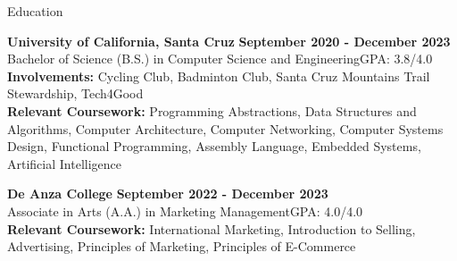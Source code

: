 \documentclass{resume}
\begin{document}
\begin{rSection}{\large Education}

{\bf University of California, Santa Cruz} \hfill {\bf{September 2020 - December 2023}}
\\ Bachelor of Science (B.S.) in Computer Science and Engineering\hfill {GPA: 3.8/4.0}
\\ \textbf{Involvements:}  Cycling Club, Badminton Club, Santa Cruz Mountains Trail Stewardship, Tech4Good
\\ \textbf{Relevant Coursework:} Programming Abstractions, Data Structures and Algorithms, Computer Architecture, Computer Networking, Computer Systems Design, Functional Programming, Assembly Language, Embedded Systems, Artificial Intelligence

{\bf De Anza College} \hfill {\bf{September 2022 - December 2023}}
\\ Associate in Arts (A.A.) in Marketing Management\hfill {GPA: 4.0/4.0}
\\ \textbf{Relevant Coursework:} International Marketing, Introduction to Selling, Advertising, Principles of Marketing, Principles of E-Commerce

\end{rSection}
\end{document}
